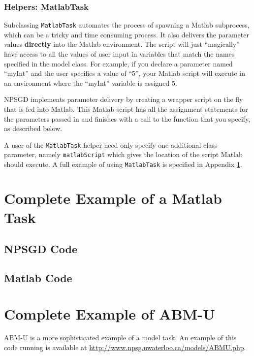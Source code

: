 \documentclass{article}
\newcommand{\mclass}[1]{\sloppy\texttt{#1}}
\begin{document}
\subsubsection{Helpers: MatlabTask}
Subclassing \mclass{MatlabTask} automates the process of spawning a Matlab
subprocess, which can be a tricky and time consuming process. It also delivers
the parameter values \textbf{directly} into the Matlab environment. The script
will just ``magically'' have access to all the values of user input in variables
that match the names specified in the model class. For example, if you declare a
parameter named ``myInt'' and the user specifies a value of ``5'', your Matlab
script will execute in an environment where the ``myInt'' variable is assigned
5.

NPSGD implements parameter delivery by creating a wrapper script on the fly that
is fed into Matlab. This Matlab script has all the assignment statements for the
parameters passed in and finishes with a call to the function that you specify,
as described below.

A user of the \mclass{MatlabTask} helper need only specify one additional class
parameter, namely \texttt{matlabScript} which gives the location of the script
Matlab should execute. A full example of using \mclass{MatlabTask} is specified
in Appendix \ref{sec:MatlabExample}.

\appendix

\section{Complete Example of a Matlab Task}
\label{sec:MatlabExample}
\subsection{NPSGD Code}


\subsection{Matlab Code}


\section{Complete Example of ABM-U}
ABM-U is a more sophisticated example of a model task. An example of this code
running is available at \url{http://www.npsg.uwaterloo.ca/models/ABMU.php}.

\end{document}
